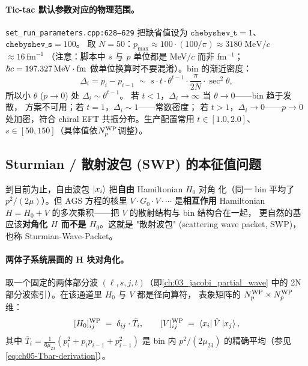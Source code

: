 \paragraph{Tic-tac 默认参数对应的物理范围。}
\texttt{set\_run\_parameters.cpp:628--629} 把缺省值设为
\(\texttt{chebyshev\_t} = 1\)、\(\texttt{chebyshev\_s} = 100\)。
取 \(N = 50\)：\(p_{\max} \approx 100 \cdot (100 / \pi) \approx 3180 \;\mathrm{MeV}/c\)
\(\approx 16\,\mathrm{fm}^{-1}\) （注意：脚本中 \(s\) 与 \(p\) 单位都是
MeV\(/c\) 而非 fm\(^{-1}\)；\(\hbar c = 197.327\,\text{MeV}\cdot\text{fm}\)
做单位换算时不要混淆）。bin 的渐近密度：
\begin{equation}
\label{eq:ch05-cheb-density}
\Delta_i = p_i - p_{i-1}
\;\sim\;
s \cdot t \cdot \theta^{t-1}\!\cdot \frac{\pi}{2N}\!\cdot \sec^2\theta,
\end{equation}
所以小 \(\theta\) (\(p \to 0\)) 处 \(\Delta_i \sim \theta^{t-1}\)。
若 \(t < 1\)，\(\Delta_i \to \infty\) 当 \(\theta \to 0\)——bin 趋于发散，
方案不可用；若 \(t = 1\)，\(\Delta_i \sim 1\)——常数密度；
若 \(t > 1\)，\(\Delta_i \to 0\)——\(p \to 0\) 处加密，符合 chiral EFT
共振分布。生产配置常用 \(t \in [1.0, 2.0]\)、
\(s \in [50, 150]\)（具体值依\({N_{p}^{\text{WP}}}\)调整）。

\subsection{Sturmian / 散射波包 (SWP) 的本征值问题}
\label{subsec:ch05-SWP-def}

到目前为止，自由波包 \(\ket{x_{i}}\) 把\textbf{自由} Hamiltonian \(H_0\) 对角
化（同一 bin 平均了 \(p^2/(2\mu)\)）。但 AGS 方程的核里
\(V \cdot G_0 \cdot V \cdot \cdots\) 是\textbf{相互作用} Hamiltonian
\(H = H_0 + V\) 的多次乘积——把 \(V\) 的散射结构与 bin 结构合在一起，
更自然的基应该\textbf{对角化 \(H\) 而不是 \(H_0\)}。这就是
"散射波包" (scattering wave packet, SWP)，也称 Sturmian-Wave-Packet。

\paragraph{两体子系统层面的 H 块对角化。}
取一个固定的两体部分波 \((\ell, s, j, t)\)（即\cref{ch:03_jacobi_partial_wave}
中的 2N 部分波索引）。在该通道里 \(H_0\) 与 \(V\) 都是径向算符，
表象矩阵的 \({N_{p}^{\text{WP}}} \times {N_{p}^{\text{WP}}}\) 维：
\begin{equation}
\label{eq:ch05-H-block}
[H_0]^{\rm WP}_{ij} \;=\; \delta_{ij} \cdot \bar{T}_i,
\qquad
[V]^{\rm WP}_{ij} \;=\; \bra{x_i}\hat{V}\ket{x_{j}},
\end{equation}
其中
\(\bar{T}_i = \tfrac{1}{6\mu_{23}}(p_i^2 + p_i p_{i-1} + p_{i-1}^2)\)
是 bin 内 \(p^2/(2\mu_{23})\) 的精确平均（参见 \cref{eq:ch05-Tbar-derivation}）。

